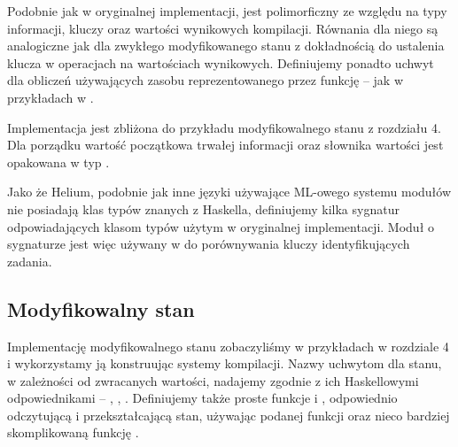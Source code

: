 Podobnie jak  w oryginalnej implementacji,  jest polimorficzny ze względu na typy informacji, kluczy oraz wartości wynikowych kompilacji. Równania dla niego są analogiczne jak dla zwykłego modyfikowanego stanu z dokładnością do ustalenia klucza w operacjach na wartościach wynikowych. Definiujemy ponadto uchwyt  dla obliczeń używających zasobu reprezentowanego przez funkcję -- jak w przykładach w \BSaLC{}.



Implementacja jest zbliżona do przykładu modyfikowalnego stanu z rozdziału 4. Dla porządku wartość początkowa trwałej informacji oraz słownika wartości jest opakowana w typ .

Jako że Helium, podobnie jak inne języki używające ML-owego systemu modułów nie posiadają klas typów znanych z Haskella, definiujemy kilka sygnatur odpowiadających klasom typów użytym w oryginalnej implementacji. Moduł o sygnaturze  jest więc używany w  do porównywania kluczy identyfikujących zadania.

\begin{minipage}[t]{.45\textwidth}

  

\end{minipage}\hfill
\begin{minipage}[t]{.45\textwidth}

  

\end{minipage}

\subsection{Modyfikowalny stan}

Implementację modyfikowalnego stanu zobaczyliśmy w przykładach w rozdziale 4 i wykorzystamy ją konstruując systemy kompilacji. Nazwy uchwytom dla stanu, w zależności od zwracanych wartości, nadajemy zgodnie z ich Haskellowymi odpowiednikami -- , , . Definiujemy także proste funkcje  i , odpowiednio odczytującą i przekształcającą stan, używając podanej funkcji oraz nieco bardziej skomplikowaną funkcję .

